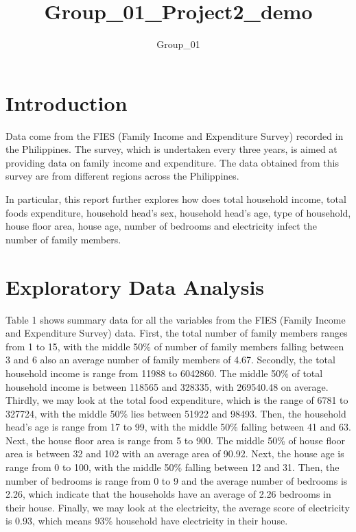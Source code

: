 \documentclass[
]{article}
\title{Group\_01\_Project2\_demo}
\author{Group\_01}
\date{}
\begin{document}
\maketitle

\hypertarget{sec:Intro}{%
\section{Introduction}\label{sec:Intro}}

Data come from the FIES (Family Income and Expenditure Survey) recorded
in the Philippines. The survey, which is undertaken every three years,
is aimed at providing data on family income and expenditure. The data
obtained from this survey are from different regions across the
Philippines.

In particular, this report further explores how does total household
income, total foods expenditure, household head's sex, household head's
age, type of household, house floor area, house age, number of bedrooms
and electricity infect the number of family members.

\hypertarget{sec:EDA}{%
\section{Exploratory Data Analysis}\label{sec:EDA}}

Table 1 shows summary data for all the variables from the FIES (Family
Income and Expenditure Survey) data. First, the total number of family
members ranges from 1 to 15, with the middle 50\% of number of family
members falling between 3 and 6 also an average number of family members
of 4.67. Secondly, the total household income is range from 11988 to
6042860. The middle 50\% of total household income is between 118565 and
328335, with 269540.48 on average. Thirdly, we may look at the total
food expenditure, which is the range of 6781 to 327724, with the middle
50\% lies between 51922 and 98493. Then, the household head's age is
range from 17 to 99, with the middle 50\% falling between 41 and 63.
Next, the house floor area is range from 5 to 900. The middle 50\% of
house floor area is between 32 and 102 with an average area of 90.92.
Next, the house age is range from 0 to 100, with the middle 50\% falling
between 12 and 31. Then, the number of bedrooms is range from 0 to 9 and
the average number of bedrooms is 2.26, which indicate that the
households have an average of 2.26 bedrooms in their house. Finally, we
may look at the electricity, the average score of electricity is 0.93,
which means 93\% household have electricity in their house.
\end{document}
